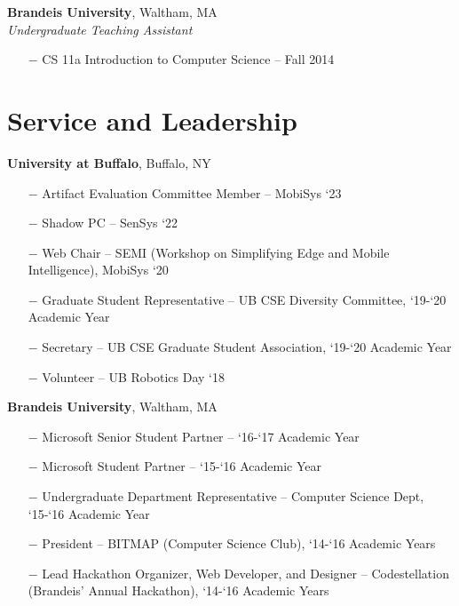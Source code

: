 \documentclass[margin,line]{res}
\begin{document}
\begin{resume}
{\bf Brandeis University}, Waltham, MA \\
{\em Undergraduate Teaching Assistant} 

\begin{itemize}
  \setlength\itemsep{-.2em}
  \item[$-$] CS 11a Introduction to Computer Science -- Fall 2014
\end{itemize}



\section{\sc Service and Leadership} 
{\bf University at Buffalo}, Buffalo, NY 
\vspace{.1cm}
\begin{itemize}
  \setlength\itemsep{-.2em}
  \item[$-$] Artifact Evaluation Committee Member {--  MobiSys `23}
  \item[$-$] Shadow PC {--  SenSys `22}
  \item[$-$] Web Chair {-- SEMI (Workshop on Simplifying Edge and Mobile Intelligence), MobiSys `20}
  \item[$-$] Graduate Student Representative {-- UB CSE Diversity Committee, `19-`20 Academic Year}
  \item[$-$] Secretary {-- UB CSE Graduate Student Association, `19-`20 Academic Year}
  \item[$-$] Volunteer {-- UB Robotics Day `18}
\end{itemize}

{\bf Brandeis University}, Waltham, MA 
\vspace{.1cm}
\begin{itemize}
  \setlength\itemsep{-.2em}
  \item[$-$] Microsoft Senior Student Partner {--  `16-`17 Academic Year}
  \item[$-$] Microsoft Student Partner {-- `15-`16 Academic Year}
  \item[$-$] Undergraduate Department Representative {-- Computer Science Dept, `15-`16 Academic Year}
  \item[$-$] President {-- BITMAP (Computer Science Club), `14-`16 Academic Years}
  \item[$-$] Lead Hackathon Organizer, Web Developer, and Designer {-- Codestellation (Brandeis' Annual Hackathon), `14-`16 Academic Years}
\end{itemize}



\end{resume}
\end{document}
